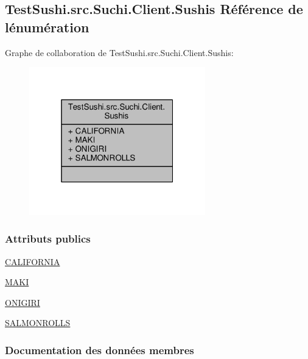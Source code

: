 \hypertarget{enumTestSushi_1_1src_1_1Suchi_1_1Client_1_1Sushis}{}\subsection{Test\+Sushi.\+src.\+Suchi.\+Client.\+Sushis Référence de l\textquotesingle{}énumération}
\label{enumTestSushi_1_1src_1_1Suchi_1_1Client_1_1Sushis}


Graphe de collaboration de Test\+Sushi.\+src.\+Suchi.\+Client.\+Sushis\+:\nopagebreak
\begin{figure}[H]
\begin{center}
\leavevmode
\includegraphics[width=217pt]{enumTestSushi_1_1src_1_1Suchi_1_1Client_1_1Sushis__coll__graph}
\end{center}
\end{figure}
\subsubsection*{Attributs publics}
\begin{DoxyCompactItemize}
\item 
\hyperlink{enumTestSushi_1_1src_1_1Suchi_1_1Client_1_1Sushis_ad2462475b40abf9811dfc3f0fbdd81a9}{C\+A\+L\+I\+F\+O\+R\+N\+I\+A}
\item 
\hyperlink{enumTestSushi_1_1src_1_1Suchi_1_1Client_1_1Sushis_a6751be68bd818ebe568bbf21644e9b3d}{M\+A\+K\+I}
\item 
\hyperlink{enumTestSushi_1_1src_1_1Suchi_1_1Client_1_1Sushis_aa5fef9965dc8b02257b6164f3cab0d44}{O\+N\+I\+G\+I\+R\+I}
\item 
\hyperlink{enumTestSushi_1_1src_1_1Suchi_1_1Client_1_1Sushis_ada01c5a8afac499c6e15c8ca0185a6b0}{S\+A\+L\+M\+O\+N\+R\+O\+L\+L\+S}
\end{DoxyCompactItemize}


\subsubsection{Documentation des données membres}
\hypertarget{enumTestSushi_1_1src_1_1Suchi_1_1Client_1_1Sushis_ad2462475b40abf9811dfc3f0fbdd81a9}{}
